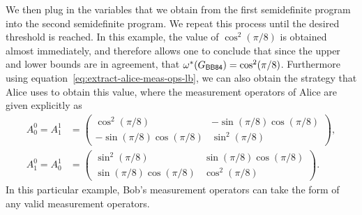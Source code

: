We then plug in the variables that we obtain from the first semidefinite program into the second semidefinite program. We repeat this process until the desired threshold is reached. In this example, the value of $\cos^2(\pi/8)$ is obtained almost immediately, and therefore allows one to conclude that since the upper and lower bounds are in agreement, that $\omega^*(G_{\BB84}) = \cos^2(\pi/8)$. Furthermore using equation~\eqref{eq:extract-alice-meas-ops-lb}, we can also obtain the strategy that Alice uses to obtain this value, where the measurement operators of Alice are given explicitly as 
\begin{equation}
	\begin{aligned}
		A_0^0 = A_1^1 &= \begin{pmatrix}
							\cos^2(\pi/8) & -\sin(\pi/8)\cos(\pi/8) \\
							-\sin(\pi/8)\cos(\pi/8) & \sin^2(\pi/8)
   						 \end{pmatrix}, \\
		A_1^0 = A_0^1 &= \begin{pmatrix}		
							\sin^2(\pi/8) & \sin(\pi/8)\cos(\pi/8) \\
							\sin(\pi/8)\cos(\pi/8) & \cos^2(\pi/8)
						 \end{pmatrix}.
	\end{aligned}
\end{equation}
In this particular example, Bob's measurement operators can take the form of any valid measurement operators. 
